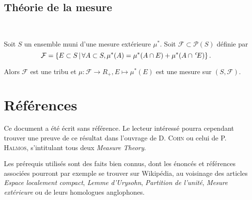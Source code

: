 \documentclass{article}
\begin{document}
\subsection{Théorie de la mesure}

\begin{Thm}[Carathéodory]~
\label{MesureExt}

Soit $S$ un ensemble muni d'une mesure extérieure $\mu^*$. Soit $\mathcal F\subset\mathcal P(S)$ définie par
$$\mathcal F=\left\{E\subset S\,|\,\forall A\subset S,\mu^*(A)=\mu^*(A\cap E)+\mu^*(A\cap\,^c\!E)\right\}\text.$$

Alors $\mathcal F$ est une tribu et $\mu:\mathcal F\to R_+,E\mapsto\mu^*(E)$ est une mesure sur $(S,\mathcal F)$.
\end{Thm}

\section{Références}

Ce document a été écrit sans référence. Le lecteur intéressé pourra cependant trouver une preuve de ce résultat dans l'ouvrage de D. \textsc{Cohn} ou celui de P. \textsc{Halmos}, s'intitulant tous deux \textit{Measure Theory}.

Les prérequis utilisés sont des faits bien connus, dont les énoncés et références associées pourront par exemple se trouver sur Wikipédia, au voisinage des articles \emph{Espace localement compact}, \emph{Lemme d'Urysohn}, \emph{Partition de l'unité}, \emph{Mesure extérieure} ou de leurs homologues anglophones.

\end{document}
